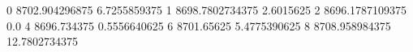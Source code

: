 0 8702.904296875 6.7255859375
1 8698.7802734375 2.6015625
2 8696.1787109375 0.0
4 8696.734375 0.5556640625
6 8701.65625 5.4775390625
8 8708.958984375 12.7802734375
